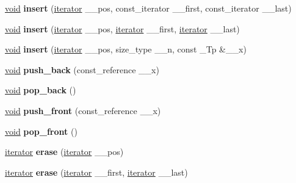 \begin{DoxyCompactItemize}
\hyperlink{interfacevoid}{void} {\bfseries insert} (\hyperlink{structiterator}{iterator} \+\_\+\+\_\+pos, const\+\_\+iterator \+\_\+\+\_\+first, const\+\_\+iterator \+\_\+\+\_\+last)
\item 
\mbox{\label{classlist_a0175f68b33220cc0fcd334e2af0a23b3}} 
\hyperlink{interfacevoid}{void} {\bfseries insert} (\hyperlink{structiterator}{iterator} \+\_\+\+\_\+pos, \hyperlink{structiterator}{iterator} \+\_\+\+\_\+first, \hyperlink{structiterator}{iterator} \+\_\+\+\_\+last)
\item 
\mbox{\label{classlist_a7001b25ab0b353fa2020b15c0091b592}} 
\hyperlink{interfacevoid}{void} {\bfseries insert} (\hyperlink{structiterator}{iterator} \+\_\+\+\_\+pos, size\+\_\+type \+\_\+\+\_\+n, const \+\_\+\+Tp \&\+\_\+\+\_\+x)
\item 
\mbox{\label{classlist_a2964db83b0b72cafec08c052d44a1ee6}} 
\hyperlink{interfacevoid}{void} {\bfseries push\+\_\+back} (const\+\_\+reference \+\_\+\+\_\+x)
\item 
\mbox{\label{classlist_a4b47aa424e48c3a3c4570a6fa3bcbb60}} 
\hyperlink{interfacevoid}{void} {\bfseries pop\+\_\+back} ()
\item 
\mbox{\label{classlist_ade13dd8920217edbd196fa4c0d4af9df}} 
\hyperlink{interfacevoid}{void} {\bfseries push\+\_\+front} (const\+\_\+reference \+\_\+\+\_\+x)
\item 
\mbox{\label{classlist_a069ca47c58b14e5da576c90240db1f34}} 
\hyperlink{interfacevoid}{void} {\bfseries pop\+\_\+front} ()
\item 
\mbox{\label{classlist_a4560bdf7557d5ded5e391aa961c2a94b}} 
\hyperlink{structiterator}{iterator} {\bfseries erase} (\hyperlink{structiterator}{iterator} \+\_\+\+\_\+pos)
\item 
\mbox{\label{classlist_a17614838a37bfb4bfd10bf136fe1adee}} 
\hyperlink{structiterator}{iterator} {\bfseries erase} (\hyperlink{structiterator}{iterator} \+\_\+\+\_\+first, \hyperlink{structiterator}{iterator} \+\_\+\+\_\+last)
\item 
\mbox{\label{classlist_a072684a2385d7439c9a68a894c9d96bd}} 

\end{DoxyCompactItemize}
